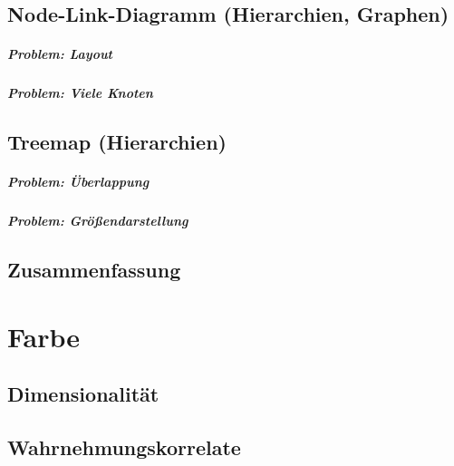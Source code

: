 \documentclass[a4paper, 11pt, accentcolor = tud3b]{tudreport}
\begin{document}
		\section{Node-Link-Diagramm (Hierarchien, Graphen)} %

			\paragraph{Problem: Layout} %

			\paragraph{Problem: Viele Knoten} %

		\section{Treemap (Hierarchien)} %

			\paragraph{Problem: Überlappung} %

			\paragraph{Problem: Größendarstellung} %

		\section{Zusammenfassung} %

	\chapter{Farbe} %

		\section{Dimensionalität} %

		\section{Wahrnehmungskorrelate} %
\end{document}
